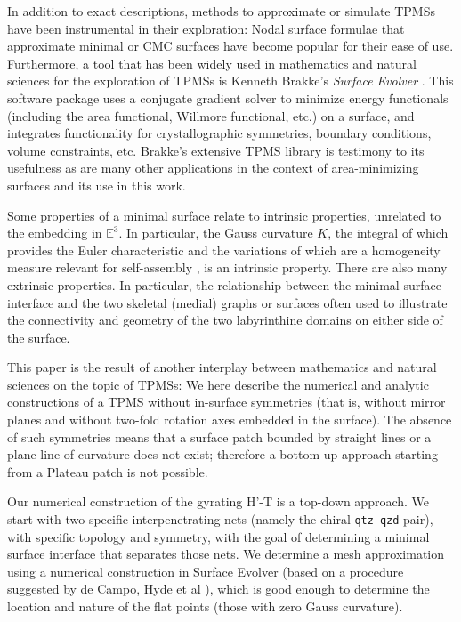 \documentclass[a4paper]{amsart}
\theoremstyle{plain}
\theoremstyle{definition}
\begin{document}
In addition to exact descriptions, methods to approximate or simulate TPMSs
have been instrumental in their exploration: Nodal surface formulae that
approximate minimal or CMC surfaces \cite{vonSchnering1991} have become popular
for their ease of use. Furthermore, a tool that has been widely used in
mathematics and natural sciences for the exploration of TPMSs is Kenneth
Brakke's \textit{Surface Evolver} \cite{Brakke_1992}. This software package
uses a conjugate gradient solver to minimize energy functionals (including the
area functional, Willmore functional, etc.) on a surface, and integrates
functionality for crystallographic symmetries, boundary conditions, volume
constraints, etc. Brakke's extensive TPMS library is testimony to its
usefulness \cite{BrakkeTPMSWebArchive} as are many other applications in the
context of area-minimizing surfaces \cite{KGB_1997,Hyde_2009} and its use in
this work. 

Some properties of a minimal surface relate to intrinsic properties, unrelated
to the embedding in $\mathbb{E}^3$. In particular, the Gauss curvature $K$, the
integral of which provides the Euler characteristic and the variations of which
are a homogeneity measure relevant for self-assembly \cite{Hyde_1990}, is an
intrinsic property. There are also many extrinsic properties. In particular,
the relationship between the minimal surface interface and the two skeletal
(medial) graphs or surfaces often used to illustrate the connectivity and
geometry of the two labyrinthine domains on either side of the surface. 

This paper is the result of another interplay between mathematics and natural
sciences on the topic of TPMSs: We here describe the numerical and analytic
constructions of a TPMS without in-surface symmetries (that is, without mirror
planes and without two-fold rotation axes embedded in the surface). The absence
of such symmetries means that a surface patch bounded by straight lines or a
plane line of curvature does not exist; therefore a bottom-up approach starting
from a Plateau patch is not possible. 

Our numerical construction of the gyrating H'-T is a top-down approach. We
start with two specific interpenetrating nets (namely the chiral
\texttt{qtz}--\texttt{qzd} pair), with specific topology and symmetry, with the
goal of determining a minimal surface interface that separates those nets. We
determine a mesh approximation using a numerical construction in Surface
Evolver (based on a procedure suggested by de Campo, Hyde et al
\cite{Hyde_2009}), which is good enough to determine the location and nature of
the flat points (those with zero Gauss curvature).
\end{document}
